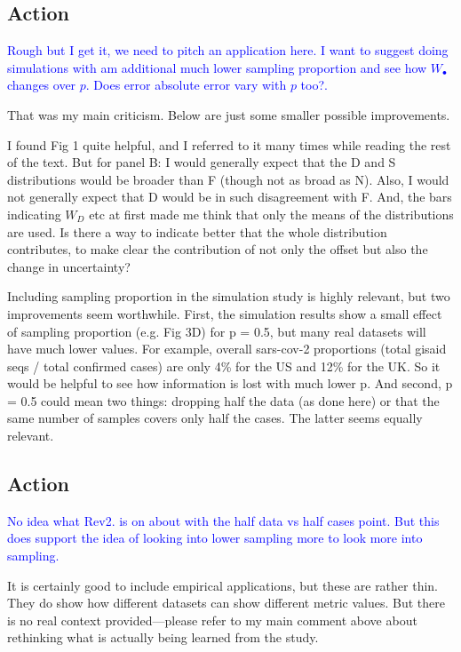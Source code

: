\documentclass{article}
\begin{document}
\subsection*{Action}
\textcolor{blue}{Rough but I get it, we need to pitch an application here. I want to suggest doing simulations with am additional much lower sampling proportion and see how $W_{\bullet}$ changes over $p$. Does error absolute error vary with $p$ too?.}
\begin{footnotesize}
That was my main criticism.  Below are just some smaller possible improvements.

I found Fig 1 quite helpful, and I referred to it many times while reading the rest of the text.  But for panel B:  I would generally expect that the D and S distributions would be broader than F (though not as broad as N).  Also, I would not generally expect that D would be in such disagreement with F.  And, the bars indicating $W_{D}$ etc at first made me think that only the means of the distributions are used.  Is there a way to indicate better that the whole distribution contributes, to make clear the contribution of not only the offset but also the change in uncertainty?
\end{footnotesize}
Including sampling proportion in the simulation study is highly relevant, but two improvements seem worthwhile.  First, the simulation results show a small effect of sampling proportion (e.g. Fig 3D) for p = 0.5, but many real datasets will have much lower values.  For example, overall sars-cov-2 proportions (total gisaid seqs / total confirmed cases) are only 4\% for the US and 12\% for the UK.  So it would be helpful to see how information is lost with much lower p.  And second, p = 0.5 could mean two things: dropping half the data (as done here) or that the same number of samples covers only half the cases.  The latter seems equally relevant.

\subsection*{Action}
\textcolor{blue}{No idea what Rev2. is on about with the half data vs half cases point. But this does support the idea of looking into lower sampling more to look more into sampling.}

\begin{footnotesize}
It is certainly good to include empirical applications, but these are rather thin.  They do show how different datasets can show different metric values.  But there is no real context provided---please refer to my main comment above about rethinking what is actually being learned from the study.
\end{footnotesize}
\end{document}
